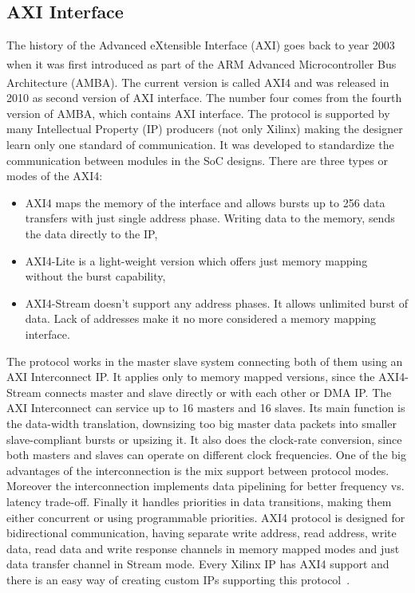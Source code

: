 \subsection{AXI Interface}
The history of the Advanced eXtensible Interface (AXI) goes back to year 2003 when it was first introduced as part of the ARM\textsuperscript{\textregistered} Advanced Microcontroller Bus Architecture (AMBA\textsuperscript{\textregistered}). The current version is called AXI4 and was released in 2010 as second version of AXI interface. The number four comes from the fourth version of AMBA, which contains AXI interface. The protocol is supported by many Intellectual Property (IP) producers (not only Xilinx) making the designer learn only one standard of communication. It was developed to standardize the communication between modules in the SoC designs. There are three types or modes of the AXI4:
\begin{itemize}
    \item AXI4 maps the memory of the interface and allows bursts up to 256 data transfers with just single address phase. Writing data to the memory, sends the data directly to the IP,
    \item AXI4-Lite is a light-weight version which offers just memory mapping without the burst capability,
    \item AXI4-Stream doesn't support any address phases. It allows unlimited burst of data. Lack of addresses make it no more considered a memory mapping interface.
\end{itemize}
The protocol works in the master slave system connecting both of them using an AXI Interconnect IP. It applies only to memory mapped versions, since the AXI4-Stream connects master and slave directly or with each other or DMA IP. The AXI Interconnect can service up to 16 masters and 16 slaves. Its main function is the data-width translation, downsizing too big master data packets into smaller slave-compliant bursts or upsizing it. It also does the clock-rate conversion, since both masters and slaves can operate on different clock frequencies. One of the big advantages of the interconnection is the mix support between protocol modes. Moreover the interconnection implements data pipelining for better frequency vs. latency trade-off. Finally it handles priorities in data transitions, making them either concurrent or using programmable priorities.
AXI4 protocol is designed for bidirectional communication, having separate write address, read address, write data, read data and write response channels in memory mapped modes and just data transfer channel in Stream mode. Every Xilinx IP has AXI4 support and there is an easy way of creating custom IPs supporting this protocol~\cite{report:AXI}.


